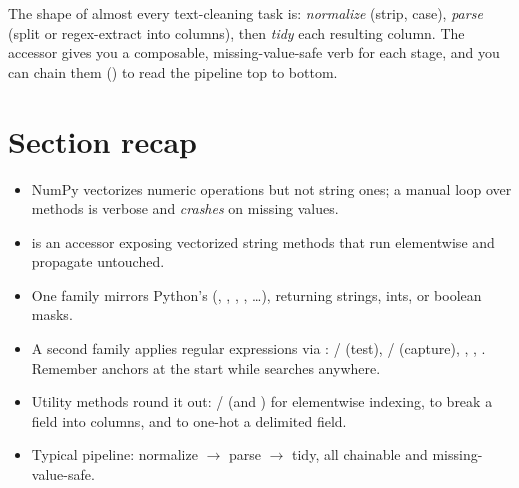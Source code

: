 \documentclass[11pt]{article}
\begin{document}
\begin{keyidea}
The shape of almost every text-cleaning task is: \emph{normalize} (strip, case), \emph{parse} (split or regex-extract into columns), then \emph{tidy} each resulting column. The  accessor gives you a composable, missing-value-safe verb for each stage, and you can chain them () to read the pipeline top to bottom.
\end{keyidea}

\section*{Section recap}
\begin{itemize}
  \item NumPy vectorizes numeric operations but not string ones; a manual loop over  methods is verbose and \emph{crashes} on missing values.
  \item {} is an accessor exposing vectorized string methods that run elementwise and propagate  untouched.
  \item One family mirrors Python's  (, , , , \dots), returning strings, ints, or boolean masks.
  \item A second family applies regular expressions via : / (test), / (capture), , , . Remember  anchors at the start while  searches anywhere.
  \item Utility methods round it out: / (and ) for elementwise indexing,  to break a field into columns, and  to one-hot a delimited field.
  \item Typical pipeline: normalize $\rightarrow$ parse $\rightarrow$ tidy, all chainable and missing-value-safe.
\end{itemize}
\end{document}
